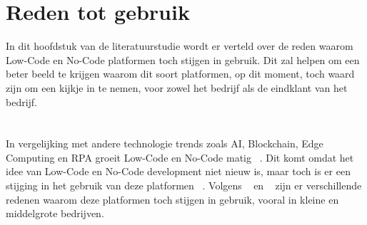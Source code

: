 \section{Reden tot gebruik}%
\label{sec:reden-tot-gebruik}
In dit hoofdstuk van de literatuurstudie wordt er verteld over de reden waarom Low-Code en No-Code platformen toch stijgen in gebruik. Dit zal helpen
om een beter beeld te krijgen waarom dit soort platformen, op dit moment, toch waard zijn om een kijkje in te nemen, voor zowel het bedrijf als de eindklant van het bedrijf.
\\
\\
\\
In vergelijking met andere technologie trends zoals AI, Blockchain, Edge Computing en RPA groeit Low-Code en No-Code matig ~\autocite{Kulkarni_2021}.
Dit komt omdat het idee van Low-Code en No-Code development niet nieuw is, maar toch is er een stijging in het gebruik van deze platformen ~\autocite{Elshan2023}.
Volgens ~\textcite{Elshan2023} en ~\textcite{Kulkarni_2021} zijn er verschillende redenen waarom deze platformen toch stijgen in gebruik, vooral in kleine en middelgrote bedrijven.
